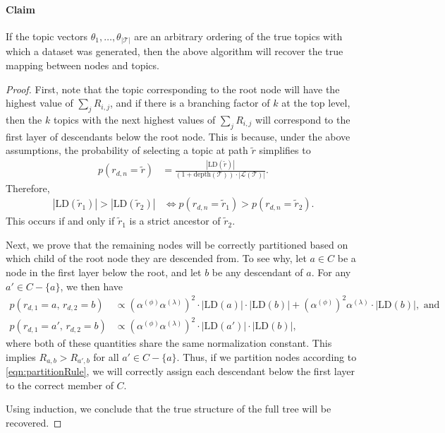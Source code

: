 \documentclass{article}
\begin{document}
\paragraph{Claim} If the topic vectors $\theta_1, \ldots, \theta_{|\mathcal T|}$ are an arbitrary ordering of the true topics with which a dataset was generated, then the above algorithm will recover the true mapping between nodes and topics.

\begin{proof}
First, note that the topic corresponding to the root node will have the highest value of $\sum_j R_{i,j}$,
and if there is a branching factor of $k$ at the top level, then the $k$ topics with the next highest values of $\sum_j R_{i,j}$ will correspond to the first layer of descendants below the root node.
This is because, under the above assumptions, the probability of selecting a topic at path $\tilde r$ simplifies to
\begin{align}
p(r_{d,n} = \tilde r)
&=
\frac{|\text{LD}(\tilde r)|}{(1 + \text{depth}(\mathcal T)) \cdot |\mathcal L(\mathcal T)|}.
\end{align}
Therefore,
\begin{align}
|\text{LD}(\tilde r_1)| > |\text{LD}(\tilde r_2)|
&\iff
p(r_{d,n} = \tilde r_1) > p(r_{d,n} = \tilde r_2).
\end{align}
This occurs if and only if $\tilde r_1$ is a strict ancestor of $\tilde r_2$.

Next, we prove that the remaining nodes will be correctly partitioned based on which child of the root node they are descended from.
To see why, let $a \in C$ be a node in the first layer below the root, and let $b$ be any descendant of $a$.
For any $a' \in C - \{a\}$, we then have
\begin{align}
p(r_{d,1} = a, \, r_{d,2} = b)
&\propto
  \left( \alpha^{(\phi)} \alpha^{(\lambda)} \right)^2 \cdot |\text{LD}(a)| \cdot |\text{LD}(b)|
  + \left( \alpha^{(\phi)} \right)^2 \alpha^{(\lambda)} \cdot |\text{LD}(b)|
,\text{ and} \\
p(r_{d,1} = a', \, r_{d,2} = b)
&\propto
  \left( \alpha^{(\phi)} \alpha^{(\lambda)} \right)^2 \cdot |\text{LD}(a')| \cdot |\text{LD}(b)|,
\end{align}
where both of these quantities share the same normalization constant.
This implies $R_{a,b} > R_{a',b}$ for all $a' \in C - \{a\}$.
Thus, if we partition nodes according to \eqref{eqn:partitionRule}, we will correctly assign each descendant below the first layer to the correct member of $C$.

Using induction, we conclude that the true structure of the full tree will be recovered.
\end{proof}
\end{document}
